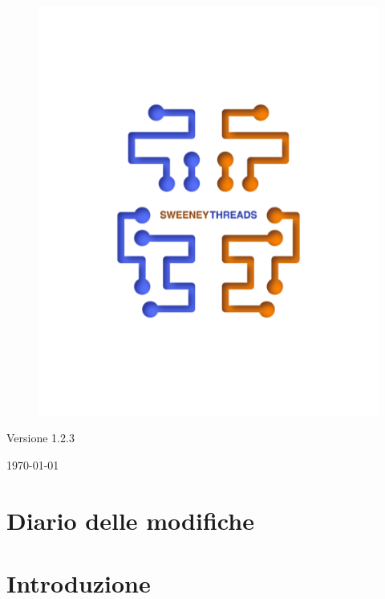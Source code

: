 \documentclass[a4paper]{article}
\begin{document}
\begin{titlepage}
		\begin{figure}[H]
			\centering
			\includegraphics[scale=0.8]{sweeney.png}
		\end{figure}
		\begin{center}
			Versione 1.2.3
		\end{center}
		{\large \today}\\[3cm] 
		\vfill  
	\end{titlepage}
	
	
	\tableofcontents
	
	\newpage
	\section*{Diario delle modifiche}

	\newpage	
	\section{Introduzione}
\end{document}
